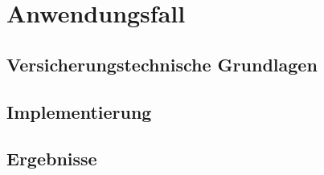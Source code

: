 \chapter{Anwendungsfall}\label{chap:anwendungsfall}

\section{Versicherungstechnische Grundlagen}

\section{Implementierung}

\section{Ergebnisse}